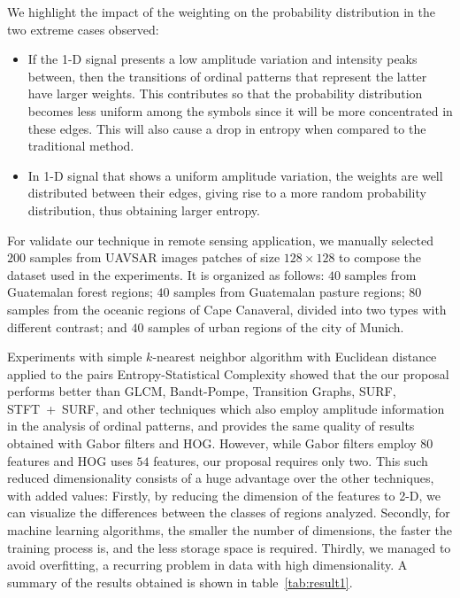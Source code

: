 \documentclass[a4,11pt]{pssbmac}
\begin{document}
We highlight the impact of the weighting on the probability distribution in the two extreme cases observed:
\begin{itemize}
	\item If the \mbox{1-D} signal presents a low amplitude variation and intensity peaks between, then the transitions of ordinal patterns that represent the latter have larger weights.
	This contributes so that the probability distribution becomes less uniform among the symbols since it will be more concentrated in these edges.
	This will also cause a drop in entropy when compared to the traditional method.
	\item In \mbox{1-D} signal that shows a uniform amplitude variation, the weights are well distributed between their edges, giving rise to a more random probability distribution, thus obtaining larger entropy.
\end{itemize}

For validate our technique in remote sensing application, we manually selected $200$ samples from UAVSAR images patches of size $128 \times 128$ to compose the dataset used in the experiments.
It is organized as follows:
$40$ samples from Guatemalan forest regions;
$40$ samples from Guatemalan pasture regions;
$80$ samples from the oceanic regions of Cape Canaveral, divided into two types with different contrast; and
$40$ samples of urban regions of the city of Munich.

Experiments with simple $k$-nearest neighbor algorithm with Euclidean distance applied to the pairs Entropy-Statistical Complexity showed that the our proposal performs better than GLCM, Bandt-Pompe, Transition Graphs, SURF, \mbox{STFT + SURF}, and other techniques which also employ amplitude information in the analysis of ordinal patterns, and provides the same quality of results obtained with Gabor filters and HOG.
However, while Gabor filters employ $80$ features and HOG uses $54$ features, our proposal requires only two.
This such reduced dimensionality consists of a huge advantage over the other techniques, with added values:
Firstly, by reducing the dimension of the features to \mbox{2-D}, we can visualize the differences between the classes of regions analyzed.
Secondly, for machine learning algorithms, the smaller the number of dimensions, the faster the training process is, and the less storage space is required.
Thirdly, we managed to avoid overfitting, a recurring problem in data with high dimensionality.
A summary of the results obtained is shown in table~\ref{tab:result1}.
\end{document}
